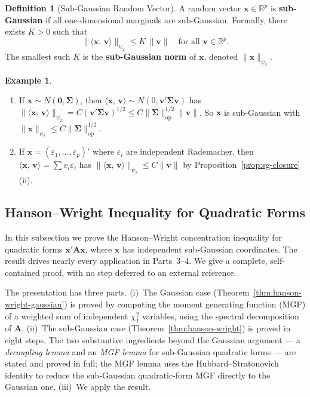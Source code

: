\documentclass[14pt]{extarticle}
\theoremstyle{plain}
\theoremstyle{definition}
\newtheorem{definition}{Definition}[section]
\newtheorem{example}{Example}[section]
\theoremstyle{remark}
\newcommand{\bx}{\mathbf{x}}
\newcommand{\bzero}{\mathbf{0}}
\newcommand{\bA}{\mathbf{A}}
\newcommand{\bv}{\mathbf{v}}
\newcommand{\Real}{\mathbb{R}}
\newcommand{\bSigma}{\boldsymbol{\Sigma}}
\newcommand{\ip}[2]{\langle #1,\, #2 \rangle}
\newcommand{\opnorm}[1]{\|#1\|_{\mathrm{op}}}
\begin{document}
\begin{definition}[Sub-Gaussian Random Vector]\label{def:sg-vector}
A random vector $\bx \in \Real^p$ is \textbf{sub-Gaussian} if all one-dimensional marginals are sub-Gaussian. Formally, there exists $K > 0$ such that
\begin{equation}\label{eq:sg-vector}
\|\ip{\bx}{\bv}\|_{\psi_2} \leqslant K\,\|\bv\| \quad \text{for all } \bv \in \Real^p.
\end{equation}
The smallest such $K$ is the \textbf{sub-Gaussian norm} of $\bx$, denoted $\|\bx\|_{\psi_2}$.
\end{definition}

\begin{example}\label{ex:sg-vector}
\leavevmode
\begin{enumerate}[label=\textup{(\arabic*)}]
\item If $\bx \sim N(\bzero, \bSigma)$, then $\ip{\bx}{\bv} \sim N(0, \bv'\bSigma\bv)$ has $\|\ip{\bx}{\bv}\|_{\psi_2} = C(\bv'\bSigma\bv)^{1/2} \leqslant C\|\bSigma\|_{\mathrm{op}}^{1/2}\|\bv\|$. So $\bx$ is sub-Gaussian with $\|\bx\|_{\psi_2} \leqslant C\opnorm{\bSigma}^{1/2}$.
\item If $\bx = (\varepsilon_1, \ldots, \varepsilon_p)'$ where $\varepsilon_i$ are independent Rademacher, then $\ip{\bx}{\bv} = \sum v_i\varepsilon_i$ has $\|\ip{\bx}{\bv}\|_{\psi_2} \leqslant C\|\bv\|$ by Proposition~\ref{prop:sg-closure}(ii).
\end{enumerate}
\end{example}

\subsection{Hanson--Wright Inequality for Quadratic Forms}

In this subsection we prove the Hanson--Wright concentration inequality for quadratic forms $\bx'\bA\bx$, where $\bx$ has independent sub-Gaussian coordinates. The result drives nearly every application in Parts~3--4. We give a complete, self-contained proof, with no step deferred to an external reference.

The presentation has three parts. (i)~The Gaussian case (Theorem~\ref{thm:hanson-wright-gaussian}) is proved by computing the moment generating function (MGF) of a weighted sum of independent $\chi^2_1$ variables, using the spectral decomposition of $\bA$. (ii)~The sub-Gaussian case (Theorem~\ref{thm:hanson-wright}) is proved in eight steps. The two substantive ingredients beyond the Gaussian argument --- a \emph{decoupling lemma} and an \emph{MGF lemma} for sub-Gaussian quadratic forms --- are stated and proved in full; the MGF lemma uses the Hubbard--Stratonovich identity to reduce the sub-Gaussian quadratic-form MGF directly to the Gaussian one. (iii)~We apply the result.
\end{document}
